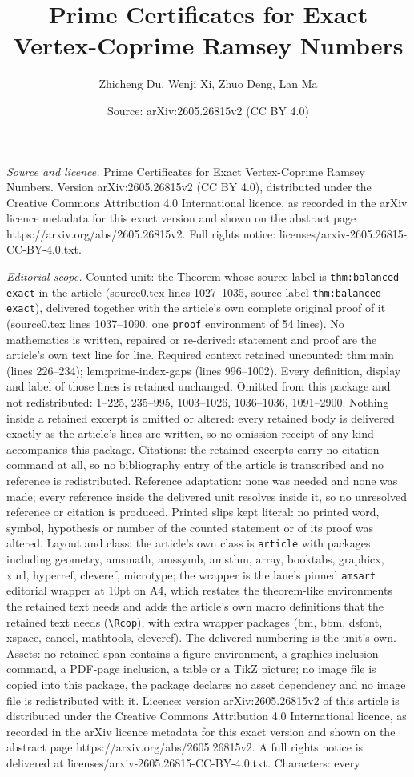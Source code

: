 \documentclass[10pt,a4paper]{amsart}
\title[Prime Certificates for Exact Vertex-Coprime Ramsey Numbers]{Prime Certificates for Exact Vertex-Coprime Ramsey Numbers}
\author{Zhicheng Du, Wenji Xi, Zhuo Deng, Lan Ma}
\date{Source: arXiv:2605.26815v2 (CC BY 4.0)}
\begin{document}
\maketitle

\noindent\emph{Source and licence.} Prime Certificates for Exact Vertex-Coprime Ramsey Numbers. Version arXiv:2605.26815v2 (CC BY 4.0), distributed under the Creative Commons Attribution 4.0 International licence, as recorded in the arXiv licence metadata for this exact version and shown on the abstract page https://arxiv.org/abs/2605.26815v2. Full rights notice: licenses/arxiv-2605.26815-CC-BY-4.0.txt.\par\smallskip

\noindent\textit{Editorial scope.} Counted unit: the Theorem whose source label is \texttt{thm:balanced-exact} in the article (source0.tex lines 1027--1035, source label \texttt{thm:balanced-exact}), delivered together with the article's own complete original proof of it (source0.tex lines 1037--1090, one \texttt{proof} environment of 54 lines). No mathematics is written, repaired or re-derived: statement and proof are the article's own text line for line. Required context retained uncounted: thm:main (lines 226--234); lem:prime-index-gaps (lines 996--1002). Every definition, display and label of those lines is retained unchanged. Omitted from this package and not redistributed: 1--225, 235--995, 1003--1026, 1036--1036, 1091--2900. Nothing inside a retained excerpt is omitted or altered: every retained body is delivered exactly as the article's lines are written, so no omission receipt of any kind accompanies this package. Citations: the retained excerpts carry no citation command at all, so no bibliography entry of the article is transcribed and no reference is redistributed. Reference adaptation: none was needed and none was made; every reference inside the delivered unit resolves inside it, so no unresolved reference or citation is produced. Printed slips kept literal: no printed word, symbol, hypothesis or number of the counted statement or of its proof was altered. Layout and class: the article's own class is \texttt{article} with packages including geometry, amsmath, amssymb, amsthm, array, booktabs, graphicx, xurl, hyperref, cleveref, microtype; the wrapper is the lane's pinned \texttt{amsart} editorial wrapper at 10pt on A4, which restates the theorem-like environments the retained text needs and adds the article's own macro definitions that the retained text needs (\texttt{\textbackslash Rcop}), with extra wrapper packages (bm, bbm, dsfont, xspace, cancel, mathtools, cleveref). The delivered numbering is the unit's own. Assets: no retained span contains a figure environment, a graphics-inclusion command, a PDF-page inclusion, a table or a TikZ picture; no image file is copied into this package, the package declares no asset dependency and no image file is redistributed with it. Licence: version arXiv:2605.26815v2 of this article is distributed under the Creative Commons Attribution 4.0 International licence, as recorded in the arXiv licence metadata for this exact version and shown on the abstract page https://arxiv.org/abs/2605.26815v2. A full rights notice is delivered at licenses/arxiv-2605.26815-CC-BY-4.0.txt. Characters: every 
\end{document}
